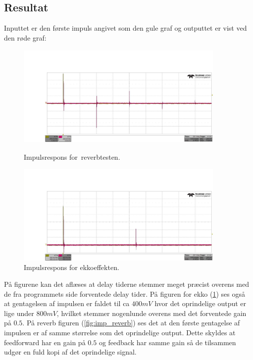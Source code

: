 \subsection{Resultat}
Inputtet er den første impuls angivet som den gule graf og outputtet er vist ved den røde graf:
\begin{figure}[!ht]
		\centering
	\begin{minipage}{0.50\textwidth}
		\centering
		\includegraphics[width=0.9\textwidth, height=5cm]{billeder/reverb.png}
		\caption{Impulsrespons for reverbtesten.}
		\label{fig:imp_reverb}
	\end{minipage}\hfill
	\begin{minipage}{0.50\textwidth}
		\centering
		\includegraphics[width=0.9\textwidth, height=5 cm]{billeder/echo.png}
		\caption{Impulsrespons for ekkoeffekten.}
		\label{fig:imp_echo}
	\end{minipage}
\end{figure}
På figurene kan det aflæses at delay tiderne stemmer meget præcist overens med de fra programmets side forventede delay tider. På figuren for ekko (\ref{fig:imp_echo}) ses også at gentagelsen af impulsen er faldet til ca $400\si{mV}$ hvor det oprindelige output er lige under $800\si{mV}$, hvilket stemmer nogenlunde overens med det forventede gain på $0.5$.\newline 
På reverb figuren (\ref{fig:imp_reverb}) ses det at den første gentagelse af impulsen er af samme størrelse som det oprindelige output. Dette skyldes at feedforward har en gain på $0.5$ og feedback har samme gain så de tilsammen udgør en fuld kopi af det oprindelige signal. 
